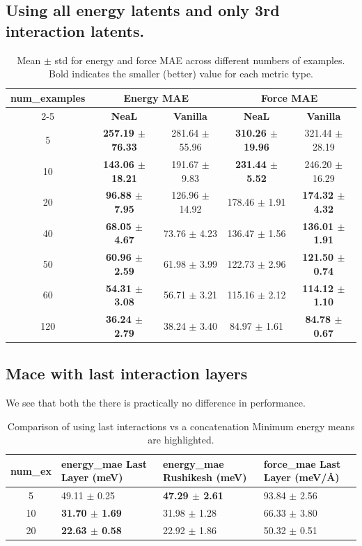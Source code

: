 \documentclass[12pt]{article}
\theoremstyle{definition}
\theoremstyle{remark}
\begin{document}
\subsection{Using all energy latents and only 3rd interaction latents.}
\begin{table}[h!]
\centering
\begin{tabular}{c|cc|cc}
\hline
\textbf{num\_examples} & \multicolumn{2}{c|}{\textbf{Energy MAE}} & \multicolumn{2}{c}{\textbf{Force MAE}} \\
\cline{2-5}
 & \textbf{NeaL} & \textbf{Vanilla} & \textbf{NeaL} & \textbf{Vanilla} \\
\hline
5   & \textbf{257.19 $\pm$ 76.33} & 281.64 $\pm$ 55.96 & \textbf{310.26 $\pm$ 19.96} & 321.44 $\pm$ 28.19 \\
10  & \textbf{143.06 $\pm$ 18.21} & 191.67 $\pm$ 9.83  & \textbf{231.44 $\pm$ 5.52}  & 246.20 $\pm$ 16.29 \\
20  & \textbf{96.88 $\pm$ 7.95}   & 126.96 $\pm$ 14.92 & 178.46 $\pm$ 1.91 & \textbf{174.32 $\pm$ 4.32} \\
40  & \textbf{68.05 $\pm$ 4.67}   & 73.76 $\pm$ 4.23   & 136.47 $\pm$ 1.56 & \textbf{136.01 $\pm$ 1.91} \\
50  & \textbf{60.96 $\pm$ 2.59}   & 61.98 $\pm$ 3.99   & 122.73 $\pm$ 2.96 & \textbf{121.50 $\pm$ 0.74} \\
60  & \textbf{54.31 $\pm$ 3.08}   & 56.71 $\pm$ 3.21   & 115.16 $\pm$ 2.12 & \textbf{114.12 $\pm$ 1.10} \\
120 & \textbf{36.24 $\pm$ 2.79}   & 38.24 $\pm$ 3.40   & 84.97 $\pm$ 1.61  & \textbf{84.78 $\pm$ 0.67} \\
\hline
\end{tabular}
\caption{Mean $\pm$ std for energy and force MAE across different numbers of examples. 
Bold indicates the smaller (better) value for each metric type.}
\label{tab:neal_vanilla_mae}
\end{table}
\newpage
\subsection{Mace with last interaction layers}
We see that both the there is practically no difference in performance.
\begin{table}[h!]
\centering
\begin{tabular}{c p{3.2cm} p{3.2cm} p{3.5cm}}
\hline
\textbf{num\_ex} & \textbf{energy\_mae Last Layer (meV)} & \textbf{energy\_mae Rushikesh (meV)} & \textbf{force\_mae Last Layer (meV/\AA)} \\
\hline
5  & 49.11 $\pm$ 0.25 & \textbf{47.29 $\pm$ 2.61} & 93.84 $\pm$ 2.56 \\
10 & \textbf{31.70 $\pm$ 1.69} & 31.98 $\pm$ 1.28 & 66.33 $\pm$ 3.80 \\
20 & \textbf{22.63 $\pm$ 0.58} & 22.92 $\pm$ 1.86 & 50.32 $\pm$ 0.51 \\
\hline
\end{tabular}
\caption{Comparison of using last interactions vs a concatenation Minimum energy means are highlighted.}
\label{tab:energy_force_mae}
\end{table} 
\end{document}
